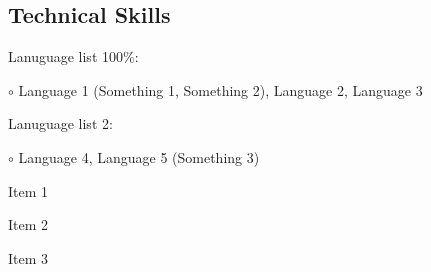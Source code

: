 \subsection*{Technical Skills}

\begin{itemize*}
  \item Lanuguage list 100\%: %
  \begin{itemize*}
    \vspace{-0.2em}
    \item[$\circ$] Language 1 (Something 1, Something 2), Language 2, Language 3
    \vspace{-0.2em}
  \end{itemize*}
  \item Lanuguage list 2: %
  \begin{itemize*}
    \vspace{-0.2em}
    \item[$\circ$] Language 4, Language 5 (Something 3)
    \vspace{-0.2em}
  \end{itemize*}
  \item Item 1
  \item Item 2
  \item Item 3
\end{itemize*}


